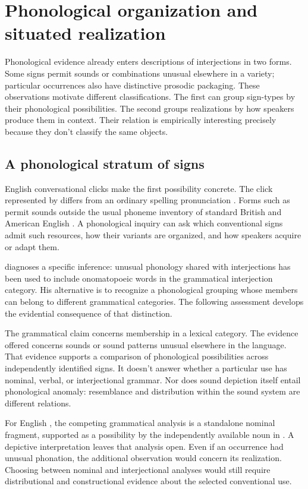 \documentclass[12pt]{article}
\begin{document}
\section{Phonological organization and situated realization}\label{sec:phonology}

Phonological evidence already enters descriptions of interjections in two
forms. Some signs permit sounds or combinations unusual elsewhere in a
variety; particular occurrences also have distinctive prosodic packaging.
These observations motivate different classifications. The first can group
sign-types by their phonological possibilities. The second groups realizations
by how speakers produce them in context. Their relation is empirically
interesting precisely because they don't classify the same objects.

\subsection{A phonological stratum of signs}

English conversational clicks make the first possibility concrete. The
click represented by  differs from an ordinary spelling
pronunciation \citep[147]{wilkins1992}. Forms such as  permit
sounds outside the usual phoneme inventory of standard British and
American English \citep[853]{quirk1985}. A phonological inquiry can
ask which conventional signs admit such resources, how their variants are
organized, and how speakers acquire or adapt them.

\textcite[112--113]{ameka1992} diagnoses a specific inference: unusual
phonology shared with interjections has been used to include onomatopoeic
words in the grammatical interjection category. His alternative is to
recognize a phonological grouping whose members can belong to different
grammatical categories. The following assessment develops the evidential
consequence of that distinction.

The grammatical claim concerns membership in a lexical category. The
evidence offered concerns sounds or sound patterns unusual elsewhere in
the language. That evidence supports a comparison of phonological
possibilities across independently identified signs. It doesn't answer
whether a particular use has nominal, verbal, or interjectional grammar.
Nor does sound depiction itself entail phonological anomaly: resemblance
and distribution within the sound system are different relations.

For English , the competing grammatical analysis is a
standalone nominal fragment, supported as a possibility by the independently
available noun in . A depictive interpretation leaves
that analysis open. Even if an occurrence had unusual phonation, the
additional observation would concern its realization. Choosing between
nominal and interjectional analyses would still require distributional
and constructional evidence about the selected conventional use.
\end{document}
